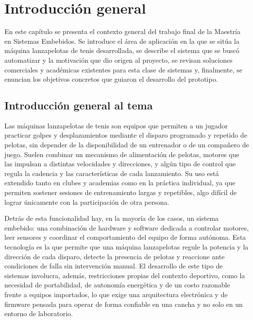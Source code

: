 
\chapter{Introducción general} %

\label{Chapter1} %
\label{IntroGeneral}

En este capítulo se presenta el contexto general del trabajo final de la Maestría en Sistemas Embebidos. Se introduce el área de aplicación en la que se sitúa la máquina lanzapelotas de tenis desarrollada, se describe el sistema que se buscó automatizar y la motivación que dio origen al proyecto, se revisan soluciones comerciales y académicas existentes para esta clase de sistemas y, finalmente, se enuncian los objetivos concretos que guiaron el desarrollo del prototipo.


\newcommand{\keyword}[1]{\textbf{#1}}
\newcommand{\tabhead}[1]{\textbf{#1}}
\newcommand{\code}[1]{\texttt{#1}}
\newcommand{\file}[1]{\texttt{\bfseries#1}}
\newcommand{\option}[1]{\texttt{\itshape#1}}
\newcommand{\grados}{$^{\circ}$}


\section{Introducción general al tema}
\label{sec:introTema}

Las máquinas lanzapelotas de tenis son equipos que permiten a un jugador practicar golpes y desplazamientos mediante el disparo programado y repetido de pelotas, sin depender de la disponibilidad de un entrenador o de un compañero de juego. Suelen combinar un mecanismo de alimentación de pelotas, motores que las impulsan a distintas velocidades y direcciones, y algún tipo de control que regula la cadencia y las características de cada lanzamiento. Su uso está extendido tanto en clubes y academias como en la práctica individual, ya que permiten sostener sesiones de entrenamiento largas y repetibles, algo difícil de lograr únicamente con la participación de otra persona.

Detrás de esta funcionalidad hay, en la mayoría de los casos, un sistema embebido: una combinación de hardware y software dedicada a controlar motores, leer sensores y coordinar el comportamiento del equipo de forma autónoma. Esta tecnología es la que permite que una máquina lanzapelotas regule la potencia y la dirección de cada disparo, detecte la presencia de pelotas y reaccione ante condiciones de falla sin intervención manual. El desarrollo de este tipo de sistemas involucra, además, restricciones propias del contexto deportivo, como la necesidad de portabilidad, de autonomía energética y de un costo razonable frente a equipos importados, lo que exige una arquitectura electrónica y de firmware pensada para operar de forma confiable en una cancha y no solo en un entorno de laboratorio.

